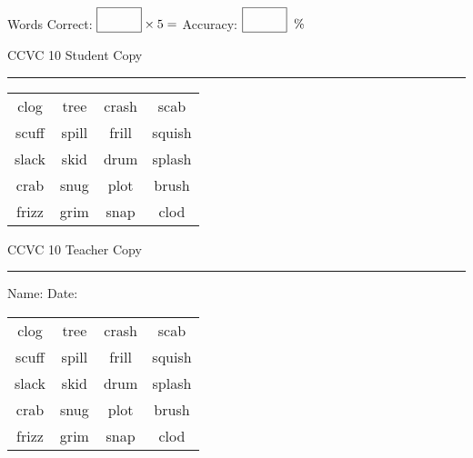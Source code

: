 \documentclass{memoir}
\begin{document}
\normalsize

Words Correct: $\fbox{\phantom{\huge 100}} \times 5 = $ Accuracy: $\fbox{\phantom{\huge 100}}\;\; \%$ 

\vfill

\newpage


\footnotesize \noindent
CCVC 10 \hfill Student Copy
\smallskip
\hrule

\Large

\setlength{\tabcolsep}{14pt}
\def\arraystretch{3}

{\selectfont


\begin{vplace}[0.5]
\begin{center}
\begin{tabular}{cccc}
clog & tree & crash & scab \\
scuff & spill & frill & squish \\
slack            & skid & drum & splash \\
crab        & snug & plot & brush \\
frizz & grim       & snap & clod \\
\end{tabular}
\end{center}
\end{vplace}

}

\newpage

\footnotesize \noindent
CCVC 10 \hfill Teacher Copy
\smallskip
\hrule

\normalsize

\vfill

\noindent
Name: \underline{\hspace{1.75in}} \hfill Date: \underline{\hspace{1in}}

\Large

{\selectfont


\begin{vplace}[0.5]
\begin{center}
\begin{tabular}{cccc}
clog & tree & crash & scab \\
scuff & spill & frill & squish \\
slack            & skid & drum & splash \\
crab        & snug & plot & brush \\
frizz & grim       & snap & clod \\
\end{tabular}
\end{center}
\end{vplace}



}
\end{document}
